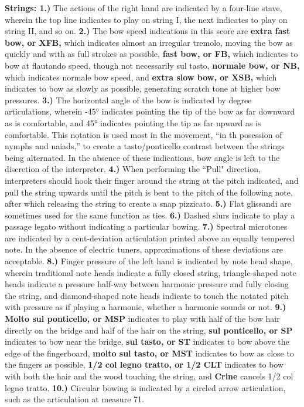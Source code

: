 \documentclass[11pt]{article}
\begin{document}
\begingroup
\begin{center}
\textbf{Strings: 1.)} The actions of the right hand are indicated by a four-line stave, wherein the top line indicates to play on string I, the next indicates to play on string II, and so on. \textbf{2.)} The bow speed indications in this score are \textbf{extra fast bow, or XFB,} which indicates almost an irregular tremolo, moving the bow as quickly and with as full strokes as possible,  \textbf{fast bow, or FB,} which indicates to bow at flautando speed, though not necessarily sul tasto, \textbf{normale bow, or NB,}  which indicates normale bow speed, and \textbf{extra slow bow, or XSB,} which indicates to bow as slowly as possible, generating scratch tone at higher bow pressures. \textbf{3.)}  The horizontal angle of the bow is indicated by degree articulations, wherein -45° indicates pointing the tip of the bow as far downward as is comfortable, and 45° indicates pointing the tip as far upward as is comfortable. This notation is used most in the movement, ``in th posession of nymphs and naiads,'' to create a tasto/ponticello contrast between the strings being alternated. In the absence of these indications, bow angle is left to the discretion of the interpreter. \textbf{4.)} When performing the ``Pull" direction, interpreters should hook their finger around the string at the pitch indicated, and pull the string upwards until the pitch is bent to the pitch of the following note, after which releasing the string to create a snap pizzicato. \textbf{5.)} Flat glissandi are sometimes used for the same function as ties. \textbf{6.)} Dashed slurs indicate to play a passage legato without indicating a particular bowing. \textbf{7.)} Spectral microtones are indicated by a cent-deviation articulation printed above an equally tempered note. In the absence of electric tuners, approximations of these deviations are acceptable. \textbf{8.)} Finger pressure of the left hand is indicated by note head shape, wherein traditional note heads indicate a fully closed string, triangle-shaped note heads indicate a pressure half-way between harmonic pressure and fully closing the string, and diamond-shaped note heads indicate to touch the notated pitch with pressure as if playing a harmonic, whether a harmonic sounds or not. \textbf{9.) Molto sul ponticello, or MSP} indicates to play with half of the bow hair directly on the bridge and half of the hair on the string, \textbf{sul ponticello, or SP} indicates to bow near the bridge, \textbf{sul tasto, or ST} indicates to bow above the edge of the fingerboard, \textbf{molto sul tasto, or MST} indicates to bow as close to the fingers as possible, \textbf{1/2 col legno tratto, or 1/2 CLT} indicates to bow with both the hair and the wood touching the string, and \textbf{Crine} cancels 1/2 col legno tratto. \textbf{10.)} Circular bowing is indicated by a circled arrow articulation, such as the articulation at measure 71. \\
\rightskip\leftskip
\end{center}
\endgroup
\end{document}
